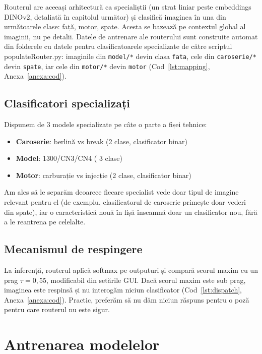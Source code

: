\documentclass[12pt, a4paper, openany]{book}
\begin{document}
Routerul are aceeași arhitectură ca specialiștii (un strat liniar peste embeddings DINOv2, detaliată în capitolul următor) și clasifică imaginea în una din următoarele clase: față, motor, spate. Acesta se bazează pe contextul global al imaginii, nu pe detalii.
\indent Datele de antrenare ale routerului sunt construite automat din folderele cu datele pentru clasificatoarele specializate de către scriptul populateRouter.py: imaginile din \texttt{model/*} devin clasa \texttt{fata}, cele din \texttt{caroserie/*} devin \texttt{spate}, iar cele din \texttt{motor/*} devin \texttt{motor} (Cod~\ref{lst:mapping}, Anexa~\ref{anexa:cod}).

\section{Clasificatori specializați}

Dispunem de 3 modele specializate pe câte o parte a fișei tehnice:

\begin{itemize}
    \item \textbf{Caroserie}: berlină vs break (2 clase, clasificator binar)
    \item \textbf{Model}: 1300/CN3/CN4 ( 3 clase)
    \item \textbf{Motor}: carburație vs injecție (2 clase, clasificator binar)
\end{itemize}

Am ales să le separăm deoarece fiecare specialist vede doar tipul de imagine relevant pentru el (de exemplu, clasificatorul de caroserie primește doar vederi din spate), iar o caracteristică nouă în fișă înseamnă doar un clasificator nou, fără a le reantrena pe celelalte.
\section{Mecanismul de respingere}

La inferență, routerul aplică softmax pe outputuri și compară scorul maxim cu un prag $ \tau=0,55 $, modificabil din setările GUI. Dacă scorul maxim este sub prag, imaginea este respinsă și nu interogăm niciun clasificator (Cod~\ref{lst:dispatch}, Anexa~\ref{anexa:cod}). Practic, preferăm să nu dăm niciun răspuns pentru o poză pentru care routerul nu este sigur.
\chapter{Antrenarea modelelor}
\end{document}
